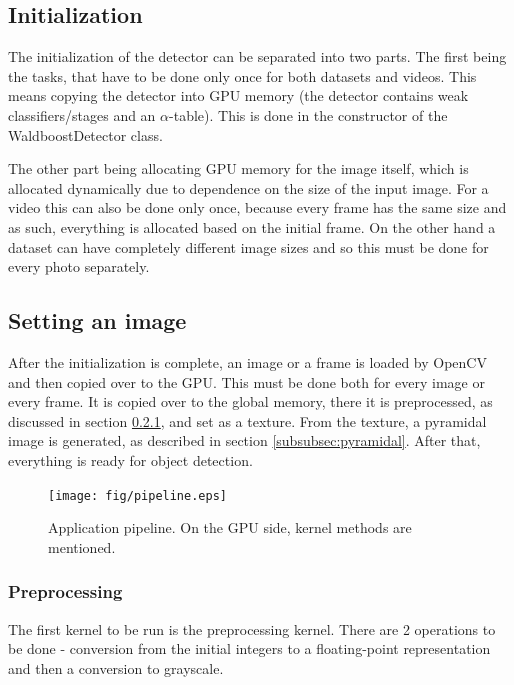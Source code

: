 \subsection{Initialization}\label{subsec:init}

The initialization of the detector can be separated into two parts. The first being the tasks, that have to be done only once for both datasets and videos. This means copying the detector into GPU memory (the detector contains weak classifiers/stages and an $\alpha$-table). This is done in the constructor of the WaldboostDetector class.

The other part being allocating GPU memory for the image itself, which is allocated dynamically due to dependence on the size of the input image. For a video this can also be done only once, because every frame has the same size and as such, everything is allocated based on the initial frame. On the other hand a dataset can have completely different image sizes and so this must be done for every photo separately.

\subsection{Setting an image}

After the initialization is complete, an image or a frame is loaded by OpenCV and then copied over to the GPU. This must be done both for every image or every frame. It is copied over to the global memory, there it is preprocessed, as discussed in section \ref{subsubsec:grayscale}, and set as a texture. From the texture, a pyramidal image is generated, as described in section \ref{subsubsec:pyramidal}. After that, everything is ready for object detection.

\begin{center}
\begin{figure}[h!]
	\centering\texttt{[image: fig/pipeline.eps]}
	\caption{Application pipeline. On the GPU side, kernel methods are mentioned.}
	\label{fig:pipeline}	
\end{figure}
\end{center}

\subsubsection{Preprocessing} \label{subsubsec:grayscale} 

The first kernel to be run is the preprocessing kernel. There are 2 operations to be done - conversion from the initial integers to a floating-point representation and then a conversion to grayscale.

